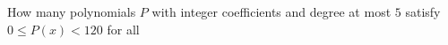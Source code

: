 How many polynomials $P$ with integer coefficients and degree at most $5$ satisfy $0 \le P(x) < 120$ for all 